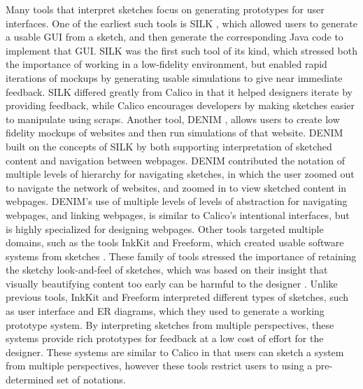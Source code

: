 \documentclass[12pt,fleqn]{ucithesis}
\begin{document}
Many tools that interpret sketches focus on generating prototypes for user interfaces. One of the earliest  such tools is SILK \citep{Landay}, which allowed users to generate a usable GUI from a sketch, and then generate the corresponding Java code to implement that GUI. SILK was the first such tool of its kind, which stressed both the importance of working in a low-fidelity environment, but enabled rapid iterations of mockups by generating usable simulations to give near immediate feedback. SILK differed greatly from Calico in that it helped designers iterate by providing feedback, while Calico encourages developers by making sketches easier to manipulate using scraps. Another tool, DENIM \citep{newman2003denim}, allows users to create low fidelity mockups of websites and then run simulations of that website. DENIM built on the concepts of SILK by both supporting interpretation of sketched content and navigation between webpages. DENIM contributed the notation of multiple levels of hierarchy for navigating sketches, in which the user zoomed out to navigate the network of websites, and zoomed in to view sketched content in webpages. DENIM's use of multiple levels of levels of abstraction for navigating webpages, and linking webpages, is similar to Calico's intentional interfaces, but is highly specialized for designing webpages. Other tools targeted multiple domains, such as the tools InkKit and Freeform, which created usable software systems from sketches \citep{chung2005inkkit,Plimmer}. These family of tools stressed the importance of retaining the sketchy look-and-feel of sketches, which was based on their insight that visually beautifying content too early can be harmful to the designer \citep{Shipman}. Unlike previous tools, InkKit and Freeform interpreted different types of sketches, such as user interface and ER diagrams, which they used to generate a working prototype system. By interpreting sketches from multiple perspectives, these systems provide rich prototypes for feedback at a low cost of effort for the designer. These systems are similar to Calico in that users can sketch a system from multiple perspectives, however these tools restrict users to using a pre-determined set of notations.
\end{document}
